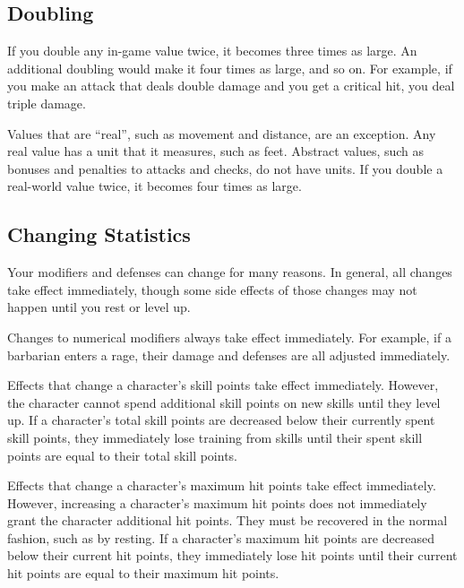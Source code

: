     \subsection{Doubling}\label{Doubling}
        If you double any in-game value twice, it becomes three times as large. An additional doubling would make it four times as large, and so on. For example, if you make an attack that deals double damage and you get a critical hit, you deal triple damage.

         Values that are ``real'', such as movement and distance, are an exception.
        Any real value has a unit that it measures, such as feet.
        Abstract values, such as bonuses and penalties to attacks and checks, do not have units.
        If you double a real-world value twice, it becomes four times as large.

    \subsection{Changing Statistics}

        Your modifiers and defenses can change for many reasons.
        In general, all changes take effect immediately, though some side effects of those changes may not happen until you rest or level up.

         Changes to numerical modifiers always take effect immediately.
        For example, if a barbarian enters a rage, their damage and defenses are all adjusted immediately.

         Effects that change a character's skill points take effect immediately.
        However, the character cannot spend additional skill points on new skills until they level up.
        If a character's total skill points are decreased below their currently spent skill points, they immediately lose training from skills until their spent skill points are equal to their total skill points.

         Effects that change a character's maximum hit points take effect immediately.
        However, increasing a character's maximum hit points does not immediately grant the character additional hit points.
        They must be recovered in the normal fashion, such as by resting.
        If a character's maximum hit points are decreased below their current hit points, they immediately lose hit points until their current hit points are equal to their maximum hit points.

